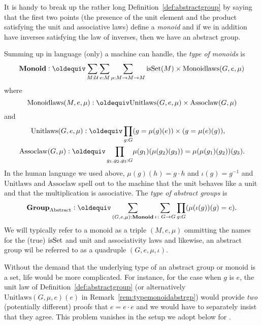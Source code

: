   \begin{remark}
    It is handy to break up the rather long Definition~\ref{def:abstractgroup}  by saying that the first two points (\ie the presence of the unit element and the product satisfying the unit and associative laws) define a {\em monoid} and if we in addition have inverses satisfying the law of inverses, then we have an abstract group.
    \end{remark}

  
    \begin{remark}\label{rem:typemonoidabstrgp}
        Summing up in language (only) a machine can handle, the {\em type of monoids} is
$$\typemonoid\defequi \sum_{M:\mathcal U}\sum_{e:M}\sum_{\mu{}:M\to M\to M}
\isset{(M)}\times\mathrm{Monoidlaws}(G,e,\mu)
$$
where 
$$\mathrm{Monoidlaws}(M,e,\mu)\defequi\mathrm{Unitlaws}(G,e,\mu)\times\mathrm{Assoclaw}(G,\mu{})$$and
\begin{align*}
  \mathrm{Unitlaws}(G,e,\mu)\defequi\prod_{g:G}
&(g=\mu{}(g)(e))\times(g=\mu{}(e)(g)),\\
\mathrm{Assoclaw}(G,\mu{})\defequi\prod_{g_1,g_2,g_3:G}&\mu{}(g_1)(\mu{}(g_2)(g_3))=\mu{}(\mu{}(g_1)(g_2))(g_3).
\end{align*}
In the human language we used above, $\mu(g)(h)=g\cdot h$ and $\iota(g)=g^{-1}$ and $\mathrm{Unitlaws}$ and $\mathrm{Assoclaw}$ spell out to the machine that the unit behaves like a unit and that the multiplication is associative.  
The
{\em type of abstract groups} is
$$\typeabsgp\defequi
\sum_{(G,e,\mu):\typemonoid}\sum_{\iota\colon G\to G}\prod_{g:G}(\mu{}(\iota{}(g))(g)=e).$$
We will typically refer to a monoid as a triple $(M,e,\mu)$ ommitting the names for the (true) $\mathrm{isSet}$ and unit and associativity laws and likewise, an abstract group wil be referred to as a quadruple $(G,e,\mu,\iota)$.
\end{remark}
  \begin{remark}
Without the demand that the underlying type of an abstract group or monoid is a set, life would be more complicated.  For instance, for the case when $g$ is $e$, the unit law of Definition~\ref{def:abstractgroup} (or alternatively $\mathrm{Unitlaws}(G,\mu{},e)(e)$ in Remark~\ref{rem:typemonoidabstrgp}) would provide {\em two} (potentially different) proofs that $e=e\cdot e$ and we would have to separately insist that they agree.  This problem vanishes in the setup we adopt below for \inftygps.
  \end{remark}


